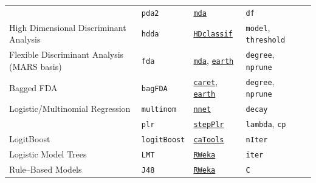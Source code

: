 \documentclass[12pt]{article}
\newcommand{\code}[1]{\mbox{\footnotesize\color{darkblue}\texttt{#1}}}
\begin{document}
\begin{landscape}
\begin{longtable}{lllll}
        & \code{pda2} & 
             {\tt \href{http://cran.r-project.org/web/packages/mda/index.html}{mda}}       & 
            \code{df} & \\ 
            
\rowcolor[rgb]{.95, .95, .95}     
                  High Dimensional Discriminant Analysis &
         \code{hdda} & 
             {\tt \href{http://cran.r-project.org/web/packages/HDclassif/index.html}{HDclassif}}      & 
            \code{model}, \code{threshold} & \\
            
         
      Flexible Discriminant Analysis (MARS basis) &
         \code{fda} & 
             {\tt \href{http://cran.r-project.org/web/packages/mda/index.html}{mda}},  {\tt \href{http://cran.r-project.org/web/packages/earth/index.html}{earth}}       & 
            \code{degree}, \code{nprune} & \\

\rowcolor[rgb]{.95, .95, .95}                 
      Bagged FDA &
         \code{bagFDA} & 
             {\tt \href{http://cran.r-project.org/web/packages/caret/index.html}{caret}},   {\tt \href{http://cran.r-project.org/web/packages/earth/index.html}{earth}}      & 
            \code{degree}, \code{nprune} & \\   
            
      Logistic/Multinomial Regression &
         \code{multinom} & 
             {\tt \href{http://cran.r-project.org/web/packages/nnet/index.html}{nnet}}     & 
            \code{decay}& \\   
      
           
   &
         \code{plr} & 
             {\tt \href{http://cran.r-project.org/web/packages/stepPlr/index.html}{stepPlr}}     & 
            \code{lambda}, \code{cp} & \\     
            
\rowcolor[rgb]{.95, .95, .95}         
      LogitBoost &      
         \code{logitBoost} & 
             {\tt \href{http://cran.r-project.org/web/packages/caTools/index.html}{caTools}}      &          
            \code{nIter} & \\              
            
               
      Logistic Model Trees &
         \code{LMT} & 
            {\tt \href{http://cran.r-project.org/web/packages/RWeka/index.html}{RWeka}}   & 
            \code{iter}  & \\  

\rowcolor[rgb]{.95, .95, .95}               
      Rule--Based Models &
         \code{J48} & 
           {\tt \href{http://cran.r-project.org/web/packages/RWeka/index.html}{RWeka}}   & 
            \code{C} & \\  
            

\end{longtable}
\end{landscape}
\end{document}

